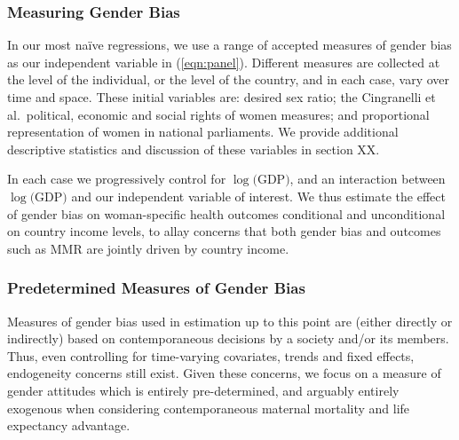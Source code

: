 \documentclass[11pt]{article}
\begin{document}
\begin{spacing}{1.4}
\subsubsection{Measuring Gender Bias}
\label{ssscn:gendbias}
In our most na\"ive regressions, we use a range of accepted measures of gender
bias as our independent variable in (\ref{eqn:panel}).  Different measures are 
collected at the level of the individual, or the level of the country, and in
each case, vary over time and space.  These initial variables are: desired sex
ratio; the Cingranelli et al.\ political, economic and social rights of women
measures; and proportional representation of women in national parliaments. We
provide additional descriptive statistics and discussion of these variables in 
section XX.

In each case we progressively control for $\log($GDP$)$, and an interaction 
between $\log($GDP$)$ and our independent variable of interest.  We thus 
estimate the effect of gender bias on woman-specific health outcomes conditional 
and unconditional on country income levels, to allay concerns that both gender 
bias and outcomes such as MMR are jointly driven by country income.

\subsubsection{Predetermined Measures of Gender Bias}
\label{ssscn:language}
Measures of gender bias used in estimation up to this point are (either directly 
or indirectly) based on contemporaneous decisions by a society and/or its 
members.  Thus, even controlling for time-varying covariates, trends and fixed 
effects, endogeneity concerns still exist.  Given these concerns, we focus on a 
measure of gender attitudes which is entirely pre-determined, and arguably 
entirely exogenous when considering contemporaneous maternal mortality and life 
expectancy advantage.


\end{spacing}
\end{document}

